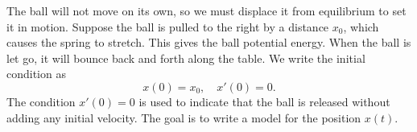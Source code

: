 \documentclass[11pt,letterpaper]{article}
\begin{document}
The ball will not move on its own, so we must displace it from equilibrium to set it in motion. Suppose the ball is pulled to the right by a distance $x_0$, which causes the spring to stretch. This gives the ball potential energy. When the ball is let go, it will bounce back and forth along the table. We write the initial condition as 
$$ x(0)=x_0,\quad x'(0)=0.$$
The condition $x'(0)=0$ is used to indicate that the ball is released without adding any initial velocity. The goal is to write a model for the position $x(t)$.


\begin{figure}[H]
\centering
{}
\end{figure}
\end{document}
